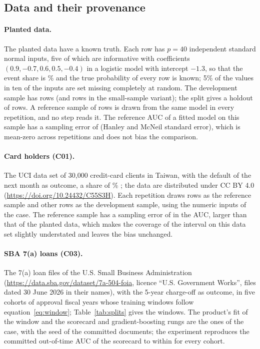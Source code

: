 \subsection{Data and their provenance}

\paragraph{Planted data.} The planted data have a known truth. Each row has $p=40$ independent standard normal inputs, five of which are informative with coefficients $(0.9,-0.7,0.6,0.5,-0.4)$ in a logistic model with intercept $-1.3$, so that the event share is \% and the true probability of every row is known; 5\% of the values in ten of the inputs are set missing completely at random. The development sample has  rows (and  rows in the small-sample variant); the split gives a holdout of  rows. A reference sample of  rows is drawn from the same model in every repetition, and no step reads it. The reference AUC of a fitted model on this sample has a sampling error of  (Hanley and McNeil standard error), which is mean-zero across repetitions and does not bias the comparison.

\paragraph{Card holders (C01).} The UCI data set of 30,000 credit-card clients in Taiwan, with the default of the next month as outcome, a share of \% \citep{yeh2009}; the data are distributed under CC BY 4.0 (\url{https://doi.org/10.24432/C55S3H}). Each repetition draws  rows as the reference sample and  other rows as the development sample, using the  numeric inputs of the case. The reference sample has a sampling error of  in the AUC, larger than that of the planted data, which makes the coverage of the interval on this data set slightly understated and leaves the bias unchanged.

\paragraph{SBA 7(a) loans (C03).} The 7(a) loan files of the U.S. Small Business Administration (\url{https://data.sba.gov/dataset/7a-504-foia}, licence ``U.S. Government Works'', files dated 30 June 2026 in their names), with the 5-year charge-off as outcome, in five cohorts of approval fiscal years whose training windows follow equation~\eqref{eq:window}; Table~\ref{tab:splits} gives the windows. The product's fit of the window and the scorecard and gradient-boosting rungs are the ones of the case, with the seed of the committed documents; the experiment reproduces the committed out-of-time AUC of the scorecard to within  for every cohort.

